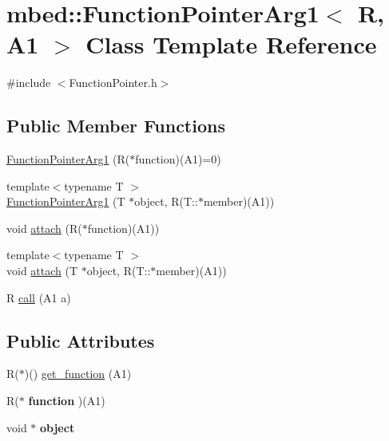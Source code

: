 \hypertarget{classmbed_1_1_function_pointer_arg1}{}\section{mbed\+:\+:Function\+Pointer\+Arg1$<$ R, A1 $>$ Class Template Reference}
\label{classmbed_1_1_function_pointer_arg1}


{\ttfamily \#include $<$Function\+Pointer.\+h$>$}

\subsection*{Public Member Functions}
\begin{DoxyCompactItemize}
\item 
\hyperlink{classmbed_1_1_function_pointer_arg1_aef73e45314e689bde71cd7b59f80fc04}{Function\+Pointer\+Arg1} (R($\ast$function)(A1)=0)
\item 
{\footnotesize template$<$typename T $>$ }\\\hyperlink{classmbed_1_1_function_pointer_arg1_abb818b9698a16c20dd8c0335e7f21c4f}{Function\+Pointer\+Arg1} (T $\ast$object, R(T\+::$\ast$member)(A1))
\item 
void \hyperlink{classmbed_1_1_function_pointer_arg1_a2a0103808b31aea189f37d88b6156ef8}{attach} (R($\ast$function)(A1))
\item 
{\footnotesize template$<$typename T $>$ }\\void \hyperlink{classmbed_1_1_function_pointer_arg1_a0a982633121d38ac036475d0e5456ab9}{attach} (T $\ast$object, R(T\+::$\ast$member)(A1))
\item 
R \hyperlink{classmbed_1_1_function_pointer_arg1_a49eb4fa6221746c3fd3d5a04fbcd5563}{call} (A1 a)
\end{DoxyCompactItemize}
\subsection*{Public Attributes}
\begin{DoxyCompactItemize}
\item 
R($\ast$)() \hyperlink{classmbed_1_1_function_pointer_arg1_a8dfc6095837c03196cf8027faf680c25}{get\+\_\+function} (A1)
\item 
R($\ast$ {\bfseries function} )(A1)\hypertarget{classmbed_1_1_function_pointer_arg1_a864fc1a43819b975c3cf767ae30041ac}{}\label{classmbed_1_1_function_pointer_arg1_a864fc1a43819b975c3cf767ae30041ac}

\item 
void $\ast$ {\bfseries object}\hypertarget{classmbed_1_1_function_pointer_arg1_a548c7abc27a7ed8f2b119940841fdb57}{}\label{classmbed_1_1_function_pointer_arg1_a548c7abc27a7ed8f2b119940841fdb57}

\end{DoxyCompactItemize}


